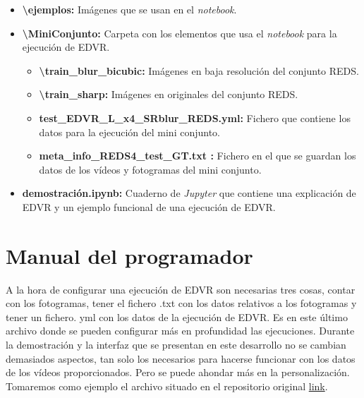 \begin{itemize}
\begin{itemize}
	\end{itemize}
    \item\textbf{\textbackslash  ejemplos:} Imágenes que se usan en el \emph{notebook}.
	\item\textbf{\textbackslash  MiniConjunto:} Carpeta con los elementos que usa el \emph{notebook} para la ejecución de EDVR.
	\begin{itemize}
		\item\textbf{\textbackslash  train\_blur\_bicubic:} Imágenes en baja resolución del conjunto REDS.
        \item\textbf{\textbackslash  train\_sharp:} Imágenes en originales del conjunto REDS.
        \item\textbf{test\_EDVR\_L\_x4\_SRblur\_REDS.yml:} Fichero que contiene los datos para la ejecución del mini conjunto.
        \item\textbf{ meta\_info\_REDS4\_test\_GT.txt :} Fichero en el que se guardan los datos de los vídeos  y fotogramas del mini conjunto.
	\end{itemize}
	\item\textbf{demostración.ipynb:} Cuaderno de \emph{Jupyter} que contiene una explicación de EDVR y un ejemplo funcional de una ejecución de EDVR.

\end{itemize}

\section{Manual del programador}

A la hora de configurar una ejecución  de EDVR son necesarias tres cosas, contar con los fotogramas, tener el fichero .txt con los datos relativos a los fotogramas y tener un fichero. yml con los datos de la ejecución de EDVR. Es en este último archivo donde se pueden configurar más en profundidad las ejecuciones. Durante la demostración y la interfaz que se presentan en este desarrollo no se cambian demasiados aspectos, tan solo los necesarios para hacerse funcionar con los datos de los vídeos proporcionados. Pero se puede ahondar más en la personalización. Tomaremos como ejemplo el archivo situado en el repositorio original \href{https://github.com/xinntao/EDVR/blob/master/options/test/EDVR/test_EDVR_L_x4_SRblur_REDS.yml}{link}.


